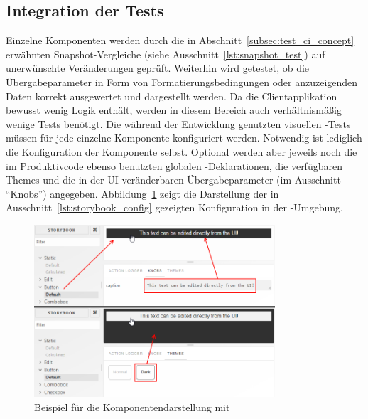 \subsection{Integration der Tests}
Einzelne Komponenten werden durch die in Abschnitt~\ref{subsec:test_ci_concept} erwähnten Snapshot-Vergleiche (siehe Ausschnitt~\ref{lst:snapshot_test}) auf unerwünschte Veränderungen geprüft. Weiterhin wird getestet, ob die Übergabeparameter in Form von Formatierungsbedingungen oder anzuzeigenden Daten korrekt ausgewertet und dargestellt werden. Da die Clientapplikation bewusst wenig Logik enthält, werden in diesem Bereich auch verhältnismäßig wenige Tests benötigt.
Die während der Entwicklung genutzten visuellen -Tests müssen für jede einzelne Komponente konfiguriert werden. Notwendig ist lediglich die Konfiguration der Komponente selbst. Optional werden aber jeweils noch die im Produktivcode ebenso benutzten globalen -Deklarationen, die verfügbaren Themes und die in der UI veränderbaren Übergabeparameter (im Ausschnitt \enquote{Knobs}) angegeben. Abbildung~\ref{fig:storybook_example} zeigt die Darstellung der in Ausschnitt~\ref{lst:storybook_config} gezeigten Konfiguration in der -Umgebung.





\begin{figure}
    \centering
    \captionsetup{justification=centering}
    \includegraphics[width=0.8\textwidth]{figures/storybook_example.png}
        \caption{Beispiel für die Komponentendarstellung mit }\label{fig:storybook_example}
\end{figure}

